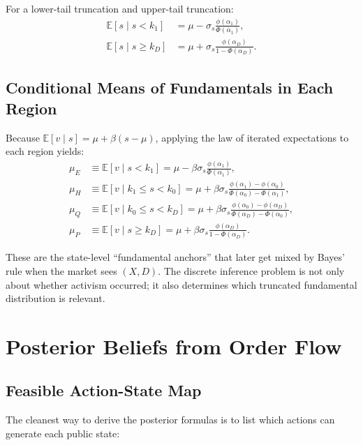 \documentclass[11pt,a4paper]{article}
\theoremstyle{definition}
\theoremstyle{plain}
\theoremstyle{remark}
\newcommand{\E}{\mathbb{E}}
\newcommand{\1}{\mathbf{1}}
\begin{document}
For a lower-tail truncation and upper-tail truncation:
\begin{align}
\E[s\mid s<k_1]
&=
\mu - \sigma_s \frac{\phi(\alpha_1)}{\Phi(\alpha_1)},
\label{eq:trunc-left}
\\
\E[s\mid s\ge k_D]
&=
\mu + \sigma_s \frac{\phi(\alpha_D)}{1-\Phi(\alpha_D)}.
\label{eq:trunc-right}
\end{align}

\subsection{Conditional Means of Fundamentals in Each Region}

Because $\E[v\mid s]=\mu+\beta(s-\mu)$, applying the law of iterated expectations to each region yields:
\begin{align}
\mu_E
&\equiv
\E[v\mid s<k_1]
=
\mu - \beta \sigma_s \frac{\phi(\alpha_1)}{\Phi(\alpha_1)},
\label{eq:muE}
\\
\mu_H
&\equiv
\E[v\mid k_1\le s<k_0]
=
\mu + \beta \sigma_s \frac{\phi(\alpha_1)-\phi(\alpha_0)}{\Phi(\alpha_0)-\Phi(\alpha_1)},
\label{eq:muH}
\\
\mu_Q
&\equiv
\E[v\mid k_0\le s<k_D]
=
\mu + \beta \sigma_s \frac{\phi(\alpha_0)-\phi(\alpha_D)}{\Phi(\alpha_D)-\Phi(\alpha_0)},
\label{eq:muQ}
\\
\mu_P
&\equiv
\E[v\mid s\ge k_D]
=
\mu + \beta \sigma_s \frac{\phi(\alpha_D)}{1-\Phi(\alpha_D)}.
\label{eq:muP}
\end{align}

\begin{intuitionbox}
These are the state-level ``fundamental anchors'' that later get mixed by Bayes' rule when the market sees $(X,D)$. The discrete inference problem is not only about whether activism occurred; it also determines which truncated fundamental distribution is relevant.
\end{intuitionbox}

\section{Posterior Beliefs from Order Flow}

\subsection{Feasible Action-State Map}

The cleanest way to derive the posterior formulas is to list which actions can generate each public state:
\end{document}
